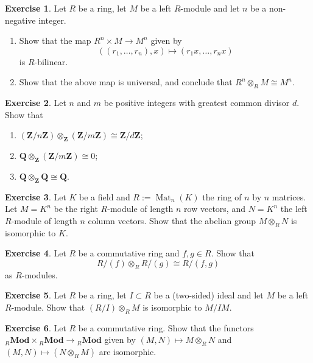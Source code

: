 \documentclass[11pt]{amsbook}
\DeclareMathOperator\Mod{{\bf{Mod}}}
\DeclareMathOperator\Mat{Mat}
\def\bQ{{\mathbf{Q}}} \def\bZ{{\mathbf{Z}}} \def\N{{\mathbf{N}}}
\def\Mod{\mathbf{Mod}}
\theoremstyle{plain}
\theoremstyle{definition}
\newtheorem{exercise}{Exercise}
\begin{document}
\begin{exercise}Let $R$ be a ring, let $M$ be a left $R$-module and let $n$ be a non-negative integer.  
\begin{enumerate}
\item Show that the map $R^n \times M \to M^n$ given by 
\[((r_1,\ldots,r_n),x) \mapsto (r_1x,\ldots, r_nx)\]
is $R$-bilinear.
\item Show that the above map is universal, and conclude that $R^n \otimes_R M \cong M^n$.
\end{enumerate}
\end{exercise}
%
%
%
\begin{exercise} \label{exc:tensor-Z-mod-nZ}
Let $n$ and $m$ be positive integers with greatest common divisor $d$. Show that 
\begin{enumerate}
\item $(\bZ/n\bZ) \otimes_\bZ (\bZ/m\bZ) \cong \bZ/d\bZ$;
\item $\bQ\otimes_\bZ (\bZ/m\bZ) \cong 0$;
\item $\bQ \otimes_\bZ \bQ \cong \bQ$.
\end{enumerate}
\end{exercise}

\begin{exercise}
Let $K$ be a field and $R:=\Mat_n(K)$ the ring of $n$ by $n$ matrices. Let $M=K^n$ be the right $R$-module of length $n$ row vectors, and $N=K^n$ the left $R$-module of length $n$ column vectors. Show that the abelian group $M\otimes_R N$ is isomorphic to $K$.
\end{exercise}


\begin{exercise}
Let $R$ be a commutative ring and $f,g\in R$. Show that
\[
	R/(f) \otimes_R R/(g) \cong R/(f,g)
\]
as $R$-modules.
\end{exercise}

\begin{exercise}
Let $R$ be a ring, let $I\subset R$ be a (two-sided) ideal and let $M$ be a left $R$-module. Show that 
$(R/I) \otimes_R M$ is isomorphic to $M/IM$.
\end{exercise}
\begin{exercise}
Let $R$ be a commutative ring. Show that the functors ${}_R\Mod \times {}_R\Mod \to {}_R\Mod$ given by $(M,N) \mapsto M\otimes_R N$ and $(M,N) \mapsto (N\otimes_R M)$ are isomorphic. 
\end{exercise}
\end{document}

